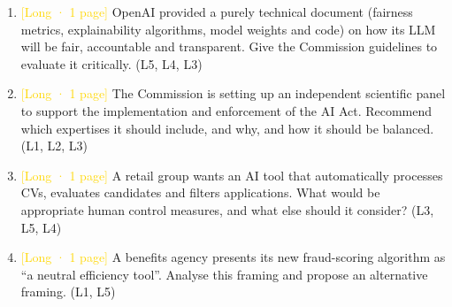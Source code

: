 \documentclass[11pt,a4paper]{article}
\begin{document}
\begin{enumerate}[label=\textbf{Q\arabic*.},leftmargin=2.4em]
\item \textcolor{gold}{[Long · 1 page]} OpenAI provided a purely technical document (fairness metrics, explainability algorithms, model weights and code) on how its LLM will be fair, accountable and transparent. Give the Commission guidelines to evaluate it critically. {\small\color{gray}(L5, L4, L3)}
\item \textcolor{gold}{[Long · 1 page]} The Commission is setting up an independent scientific panel to support the implementation and enforcement of the AI Act. Recommend which expertises it should include, and why, and how it should be balanced. {\small\color{gray}(L1, L2, L3)}
\item \textcolor{gold}{[Long · 1 page]} A retail group wants an AI tool that automatically processes CVs, evaluates candidates and filters applications. What would be appropriate human control measures, and what else should it consider? {\small\color{gray}(L3, L5, L4)}
\item \textcolor{gold}{[Long · 1 page]} A benefits agency presents its new fraud-scoring algorithm as “a neutral efficiency tool”. Analyse this framing and propose an alternative framing. {\small\color{gray}(L1, L5)}
\end{enumerate}
\end{document}
